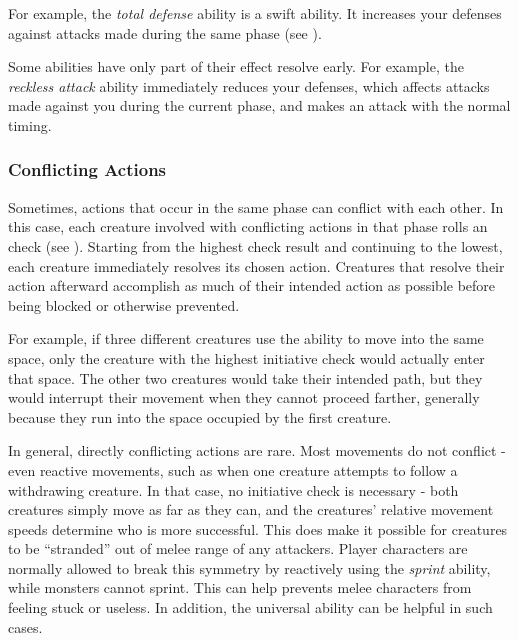             For example, the \textit{total defense} ability is a swift ability.
            It increases your defenses against attacks made during the same phase (see ).

            Some abilities have only part of their effect resolve early.
            For example, the \textit{reckless attack} ability immediately reduces your defenses, which affects attacks made against you during the current phase, and makes an attack with the normal timing.

        \subsubsection{Conflicting Actions}\label{Conflicting Actions}
            Sometimes, actions that occur in the same phase can conflict with each other.
            In this case, each creature involved with conflicting actions in that phase rolls an  check (see ).
            Starting from the highest check result and continuing to the lowest, each creature immediately resolves its chosen action.
            Creatures that resolve their action afterward accomplish as much of their intended action as possible before being blocked or otherwise prevented.

            For example, if three different creatures use the  ability to move into the same space, only the creature with the highest initiative check would actually enter that space.
            The other two creatures would take their intended path, but they would interrupt their movement when they cannot proceed farther, generally because they run into the space occupied by the first creature.

            In general, directly conflicting actions are rare.
            Most movements do not conflict - even reactive movements, such as when one creature attempts to follow a withdrawing creature.
            In that case, no initiative check is necessary - both creatures simply move as far as they can, and the creatures' relative movement speeds determine who is more successful.
            This does make it possible for creatures to be ``stranded'' out of melee range of any attackers.
            Player characters are normally allowed to break this symmetry by reactively using the \textit{sprint} ability, while monsters cannot sprint.
            This can help prevents melee characters from feeling stuck or useless.
            In addition, the  universal ability can be helpful in such cases.

